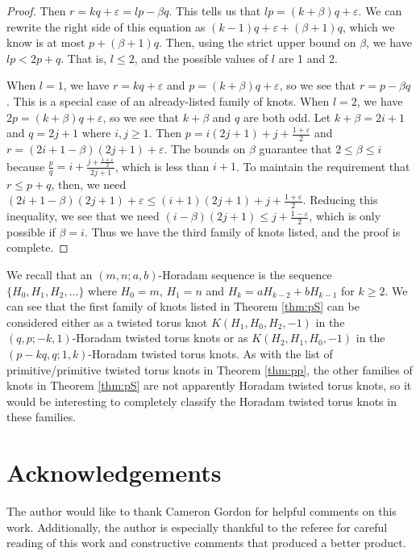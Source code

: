 \documentclass{amsart}
\newcommand{\eps}{\varepsilon}
\begin{document}
\begin{proof}
Then $r = kq + \eps = lp - \beta q$. This tells us that $lp = (k+ \beta)q + \eps$. We can rewrite the right side of this equation as $(k-1)q + \eps + (\beta + 1) q$, which we know is at most $p + (\beta + 1) q$. Then, using the strict upper bound on $\beta$, we have $l p < 2p + q$. That is, $l \le 2$, and the possible values of $l$ are 1 and 2. 

When $l =1$, we have $r = kq + \eps$ and $p = (k+ \beta) q + \eps$, so we see that $r = p - \beta q$. This is a special case of an already-listed family of knots. When $l = 2$, we have $2p = (k+\beta) q + \eps$, so we see that $k+ \beta$ and $q$ are both odd. Let $k+ \beta = 2i + 1$ and $q = 2j + 1$ where $i, j \ge 1$. Then $p = i(2j + 1) + j + \frac{1+ \eps}{2}$ and $ r= (2i+1 - \beta)(2j + 1) + \eps$. The bounds on $\beta$ guarantee that $2 \le \beta \le i$ because $\frac{p}{q} = i + \frac{j + \frac{1+\eps}{2}}{2j+1}$, which is less than $i+1$. To maintain the requirement that $r \le p+q$, then, we need $(2i+1 - \beta)(2j + 1) + \eps \le (i+1)(2j + 1) + j + \frac{1+ \eps}{2}$. Reducing this inequality, we see that we need $(i- \beta)(2j+1) \le j + \frac{1-\eps}{2}$, which is only possible if $ \beta = i$. Thus we have the third family of knots listed, and the proof is complete.

\end{proof}

We recall that an $(m,n; a,b)$-Horadam sequence is the sequence $\{H_0,H_1,H_2, \ldots\}$ where $H_0 = m$, $H_1 = n$ and $H_k = aH_{k-2} + bH_{k-1}$ for $k \ge 2$. We can see that the first family of knots listed in Theorem \ref{thm:pS} can be considered either as a twisted torus knot $K(H_1, H_0, H_2, -1)$ in the $(q,p; -k, 1)$-Horadam twisted torus knots or as $K(H_2, H_1, H_0, -1)$ in  the $(p-kq, q; 1, k)$-Horadam twisted torus knots. As with the list of primitive/primitive twisted torus knots in Theorem \ref{thm:pp}, the other families of knots in Theorem \ref{thm:pS} are not apparently Horadam twisted torus knots, so it would be interesting to completely classify the Horadam twisted torus knots in these families.
 
 
 \section{Acknowledgements}

The author would like to thank Cameron Gordon for helpful comments on this work. Additionally, the author is especially thankful to the referee for careful reading of this work and constructive comments that produced a better product.




%
%


%

%

%
\end{document}
